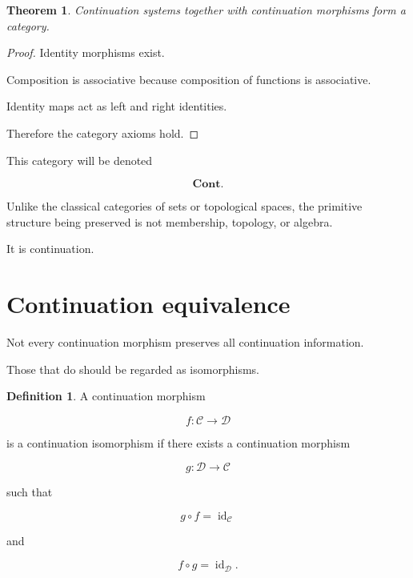 \documentclass[13pt,openany]{book}
\theoremstyle{plain}
\newtheorem{theorem}{Theorem}[chapter]
\theoremstyle{definition}
\newtheorem{definition}{Definition}[chapter]
\begin{document}
\begin{theorem}

Continuation systems together with continuation morphisms form a category.

\end{theorem}

\begin{proof}

Identity morphisms exist.

Composition is associative because composition of functions is associative.

Identity maps act as left and right identities.

Therefore the category axioms hold.

\end{proof}


This category will be denoted

\[
\mathbf{Cont}.
\]

Unlike the classical categories of sets or topological spaces, the primitive
structure being preserved is not membership, topology, or algebra.

It is continuation.


\section{Continuation equivalence}

Not every continuation morphism preserves all continuation information.

Those that do should be regarded as isomorphisms.

\begin{definition}

A continuation morphism

\[
f:\mathcal C\rightarrow\mathcal D
\]

is a continuation isomorphism if there exists a continuation morphism

\[
g:\mathcal D\rightarrow\mathcal C
\]

such that

\[
g\circ f
=
\operatorname{id}_{\mathcal C}
\]

and

\[
f\circ g
=
\operatorname{id}_{\mathcal D}.
\]

\end{definition}
\end{document}
